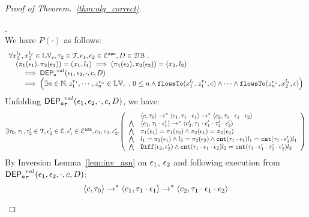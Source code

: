 \begin{proof}[Proof of Theorem.~\ref{thm:alg_correct}]
\begin{case}[$P(\cdot)$].
\label{case:valdep_base}
%
\\
We have $P(\cdot)$ as follows:
%
\[
\begin{array}{l}
\forall {x}_1^{l_1}, {x}_2^{l_2} \in \mathbb{LV}_{{c}}, \mathtt{\tau}_2 \in \mathcal{T}, 
\mathtt{\epsilon}_1, \mathtt{\epsilon}_2 \in \mathcal{E}^{\mathtt{{asn}}}, D \in \mathcal{DB} ~.~
\\ \quad
(\pi_{1}{(\mathtt{\epsilon}_1)}, \pi_{2}{(\mathtt{\epsilon}_1)}) = ({x}_1, l_1)
\implies
(\pi_{1}{(\mathtt{\epsilon}_2)}, \pi_{2}{(\mathtt{\epsilon}_2)}) = ({x}_2, l_2)
 \\ \qquad \implies 
\mathsf{DEP_{\mathtt{e}}}^{val}(\mathtt{\epsilon}_1, \mathtt{\epsilon}_2, \cdot, c, D)
 \\ \qquad \implies
   \Big(\exists  n \in \mathbb{N}, z_1^{r_1}, \cdots, z_n^{r_n} \in \mathbb{LV}_{{c}} ~.~ 0 \leq n
 \land \mathtt{flowsTo}(x_1^{l_1}, z_1^{r_1}, c) \land \cdots \land \mathtt{flowsTo}(z_n^{r_n}, {x}_2^{l_2}, c) \Big)
\end{array}
\]
%
%
%
Unfolding $\mathsf{DEP_{\mathtt{e}}}^{val}_{\mathtt{\tau}}(\mathtt{\epsilon}_1, \mathtt{\epsilon}_2, \cdot, c, D)$, we have:
\[
\exists \vtrace_0,
\vtrace_1, \vtrace_2' \in \mathcal{T}, \event_2' \in \eventset, \event_1' \in \eventset^{\asn}, {c}_1, {c}_2,  {c}_2'.
  \left(
  \begin{array}{ll}   
 & \config{{c}, \vtrace_0} \rightarrow^{*} 
\config{{c}_1, \vtrace_1 \cdot \event_1}  \rightarrow^{*} 
  \config{{c}_2,  \vtrace_1 \cdot \event_1 \cdot \event_2 } 
 \\ 
 \bigwedge &
  \config{{c}_1, \vtrace_1 \cdot \event_1'}  \rightarrow^{*} 
  \config{{c}_2',  \vtrace_1 \cdot \event_1' \cdot \vtrace_2' \cdot \event_2' } 
\\
\bigwedge &  \pi_1(\event_1) = \pi_1(\event_2) \land \pi_2(\event_1) = \pi_2(\event_2) \\
\bigwedge & l_1 = \pi_2(\event_1) \land l_2 = \pi_2(\event_2)
\land \vcounter(\vtrace_1 \cdot \event_1) l_1 = \vcounter(\vtrace_1 \cdot \event_1')l_1 
\\
\bigwedge & 
\diff(\event_2,\event_2' ) \land 
\vcounter(\vtrace_1 \cdot \event_1 \cdot \event_2) l_2
= 
\vcounter(\vtrace_1 \cdot \event_1' \cdot \vtrace_2'\cdot \event_2') l_2\\
\end{array}
\right)
\]
By Inversion Lemma~\ref{lem:inv_asn} on 
 $\mathtt{\epsilon}_1$, $\mathtt{\epsilon}_2$ and following execution from $\mathsf{DEP_{\mathtt{e}}}^{val}_{\mathtt{\tau}}(\mathtt{\epsilon}_1, \mathtt{\epsilon}_2, \cdot, c, D)$:
 \[
 \langle {c}, \mathtt{\tau}_0 \rangle \rightarrow^{*} 
\langle {c}_1, \mathtt{\tau}_1 \cdot \mathtt{\epsilon}_1 \rangle  \rightarrow^{*} 
  \langle {c}_2,  \mathtt{\tau}_1 \cdot \mathtt{\epsilon}_1 \cdot \mathtt{\epsilon}_2  \rangle 
\]
\end{case}
\end{proof}
